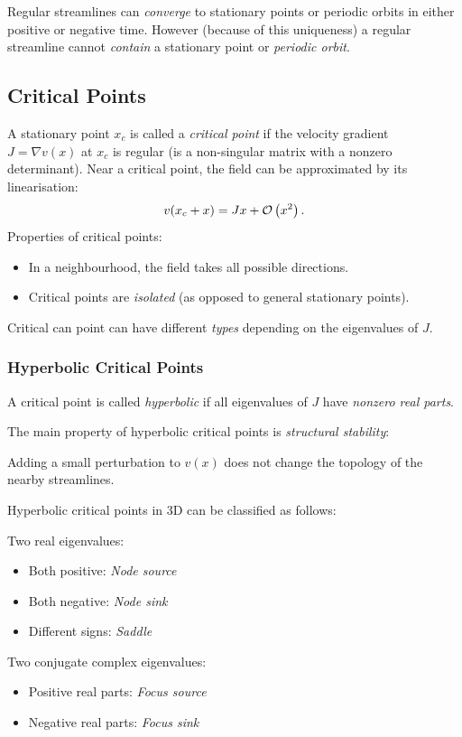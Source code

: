 Regular streamlines can \emph{converge} to stationary points or periodic orbits in either positive or negative time. However (because of this uniqueness) a regular streamline cannot \emph{contain} a stationary point or \emph{periodic orbit}.


\subsection{Critical Points}
A stationary point $x_c$ is called a \emph{critical point} if the velocity gradient $J=\nabla v(x)$ at $x_c$ is regular (is a non-singular matrix with a nonzero determinant). Near a critical point, the field can be approximated by its linearisation:
    \begin{align*}
     v(x_c+x)= Jx +\mathcal O\left(x^2\right).
    \end{align*}
Properties of critical points:
\begin{itemize}
    \item In a neighbourhood, the field takes all possible directions.
    \item Critical points are \emph{isolated} (as opposed to general stationary points).
\end{itemize}

Critical can point can have different \emph{types} depending on the eigenvalues of $J$. 
\subsubsection{Hyperbolic Critical Points}
A critical point is called \emph{hyperbolic} if all eigenvalues of $J$ have \emph{nonzero real parts}.

The main property of hyperbolic critical points is \emph{structural stability}:
\begin{description}
    \item Adding a small perturbation to $v(x)$ does not change the topology of the nearby streamlines.
\end{description}
Hyperbolic critical points in 3D can be classified as follows:
\begin{description}
    \item Two real eigenvalues:
        \begin{itemize}
            \item Both positive: \emph{Node source}
            \item Both negative: \emph{Node sink}
            \item Different signs: \emph{Saddle}
        \end{itemize}
    \item Two conjugate complex eigenvalues:
        \begin{itemize}
            \item Positive real parts: \emph{Focus source}
            \item Negative real parts: \emph{Focus sink}
        \end{itemize}
\end{description}

